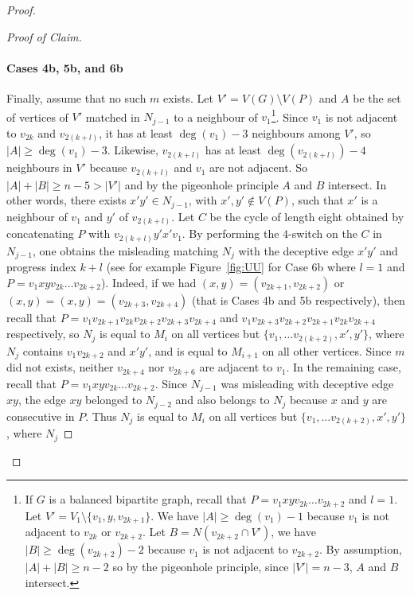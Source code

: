 \documentclass[11pt,a4paper]{article}
\theoremstyle{definition}
\newenvironment{poc}{\begin{proof}[Proof of
    Claim]\renewcommand*{\qedsymbol}{$\blacksquare$}}{\end{proof}}
\begin{document}
\begin{proof}
\begin{poc}
    \paragraph{Cases 4b, 5b, and 6b} Finally, assume that no such $m$
    exists. Let $V' = V(G) \setminus V(P)$ and $A$ be the set of vertices of
    $V'$ matched in $N_{j-1}$ to a neighbour of $v_1$\footnote{If $G$ is a
      balanced bipartite graph, recall that $P= v_1xyv_{2k}\dots v_{2k+2}$ and
      $l = 1$. Let $V' = V_1 \setminus \{v_1, y, v_{2k+1}\}$. We have
      $|A| \ge \deg(v_1) -1$ because $v_1$ is not adjacent to $v_{2k}$ or
      $v_{2k+2}$. Let $B = N(v_{2k+2} \cap V')$, we have
      $|B| \ge \deg(v_{2k+2}) - 2$ because $v_1$ is not adjacent to
      $v_{2k+2}$. By assumption, $|A| + |B| \ge n-2$ so by the pigeonhole principle,
      since $|V'| = n-3$, $A$ and $B$ intersect.}. Since $v_1$ is not adjacent
    to $v_{2k}$ and $v_{2(k+l)}$, it has at least $\deg(v_1) -3$ neighbours
    among $V'$, so $|A| \ge \deg(v_1)-3$. Likewise, $v_{2(k+l)}$ has at least
    $\deg(v_{2(k+l)})-4$ neighbours in $V'$ because $v_{2(k+l)}$ and $v_1$ are
    not adjacent. So $|A| + |B| \ge n-5 > |V'|$ and by the pigeonhole principle $A$
    and $B$ intersect. In other words, there exists $x'y' \in N_{j-1}$, with
    $x', y' \notin V(P)$, such that $x'$ is a neighbour of $v_1$ and $y'$ of
    $v_{2(k+l)}$. Let $C$ be the cycle of length eight obtained by concatenating
    $P$ with $v_{2(k+l)}y'x' v_1$. By performing the $4$-switch on the $C$ in
    $N_{j-1}$, one obtains the misleading matching $N_j$ with the deceptive edge
    $x'y'$ and progress index $k+l$ (see for example Figure~\ref{fig:UU} for Case 6b
    where $l=1$ and $P=v_1xyv_{2k}\dots v_{2k+2}$). Indeed, if we had
    $(x,y) = (v_{2k+1}, v_{2k+2})$ or $(x,y) = (x,y) = (v_{2k+3}, v_{2k+4})$
    (that is Cases 4b and 5b respectively), then recall that
    $P = v_1v_{2k+1}v_{2k}v_{2k+2}v_{2k+3}v_{2k+4}$ and
    $v_1v_{2k+3}v_{2k+2}v_{2k+1}v_{2k}v_{2k+4}$ respectively, so $N_j$ is equal
    to $M_i$ on all vertices but $\{v_1, \dots v_{2(k+2)}, x', y'\}$, where
    $N_j$ contains $v_1v_{2k+2}$ and $x'y'$, and is equal to $M_{i+1}$ on all
    other vertices. Since $m$ did not exists, neither $v_{2k+4}$ nor $v_{2k+6}$
    are adjacent to $v_1$. In the remaining case, recall that
    $P = v_1xyv_{2k}\dots v_{2k+2}$. Since $N_{j-1}$ was misleading with
    deceptive edge $xy$, the edge $xy$ belonged to $N_{j-2}$ and also belongs to
    $N_j$ because $x$ and $y$ are consecutive in $P$. Thus $N_j$ is equal to
    $M_i$ on all vertices but $\{v_1, \dots v_{2(k+2)}, x', y'\}$, where $N_j$

\end{poc}
\end{proof}
\end{document}
